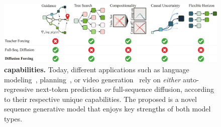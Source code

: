 \begin{figure}[t]
    \includegraphics[width=\linewidth]{figures/pdf/Capabilities.pdf}
    \caption{\textbf{\algo{} capabilities.} Today, different applications such as language modeling~\cite{gpt3}, planning~\cite{janner2022planning}, or video generation~\cite{ho2022video,yang2023diffusion} rely on \emph{either} auto-regressive next-token prediction \emph{or} full-sequence diffusion, according to their respective unique capabilities. The proposed \algons{} is a novel sequence generative model that enjoys key strengths of both model types.} 
    \label{fig:ability}
    \vspace{-5pt}
\end{figure}
